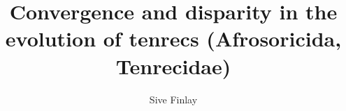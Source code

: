 \documentclass[twoside,12pt]{mythesis} %
\title{Convergence and disparity in the evolution of tenrecs (Afrosoricida, Tenrecidae)}
\author{Sive Finlay}
\begin{document}
\maketitle %

\allcontents %
\cleardoublepage
\mainbody

%	
%	

\formatbibliography %

\formatappendices
%
\end{document}

